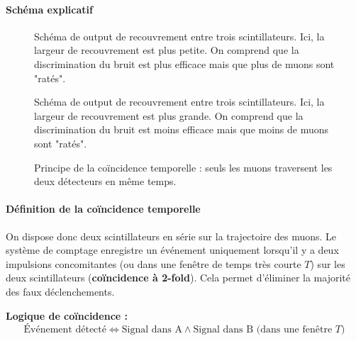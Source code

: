 \documentclass[a4paper,12pt,twoside]{article}
\begin{document}
\paragraph{Schéma explicatif}
\begin{figure}[H]
  \begin{minipage}[t]{0.48\textwidth}
    \centering
    
    \caption{Schéma de output de recouvrement entre trois scintillateurs. Ici, la largeur de recouvrement est plus petite. On comprend que la discrimination du bruit est plus efficace mais que plus de muons sont "ratés".}
    \label{fig:recouvrement_petit_width}
  \end{minipage}
  \hfill
  \begin{minipage}[t]{0.48\textwidth} 
    \centering
    
    \caption{Schéma de output de recouvrement entre trois scintillateurs. Ici, la largeur de recouvrement est plus grande. On comprend que la discrimination du bruit est moins efficace mais que moins de muons sont "ratés".}
    \label{fig:recouvrement_grand_width}
  \end{minipage}
\end{figure}

\begin{figure}[H]
    \centering
    \caption{Principe de la coïncidence temporelle : seuls les muons traversent les deux détecteurs en même temps.}
\end{figure}

\paragraph{Définition de la coïncidence temporelle}

On dispose donc deux scintillateurs en série sur la trajectoire des muons. Le système de comptage enregistre un événement uniquement lorsqu’il y a deux impulsions concomitantes (ou dans une fenêtre de temps très courte $T$) sur les deux scintillateurs (\textbf{coïncidence à 2-fold}). Cela permet d’éliminer la majorité des faux déclenchements.

\begin{center}
\begin{tcolorbox}[colback=gray!10!white, colframe=gray!80!black, boxrule=0.5pt, arc=2pt, left=2pt, right=2pt, top=2pt, bottom=2pt]
\textbf{Logique de coïncidence :} 
\[
\text{Événement détecté} \iff \text{Signal dans A} \land \text{Signal dans B} \text{ (dans une fenêtre } T)
\]
\end{tcolorbox}
\end{center}
\end{document}
